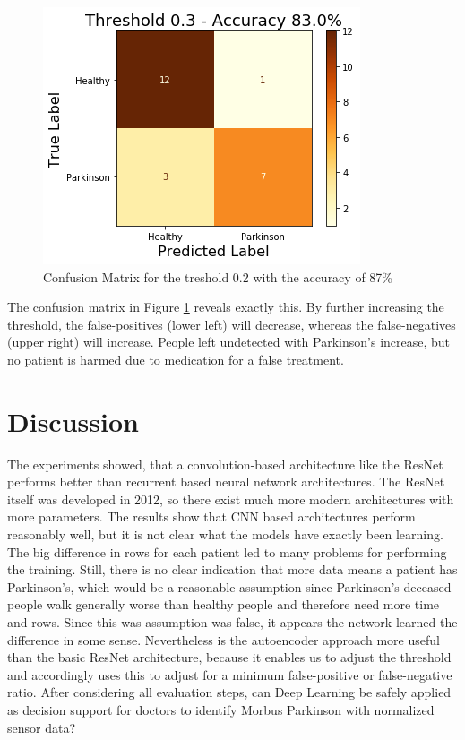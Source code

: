 \documentclass[journal]{IEEEtran}
\begin{document}
\begin{figure}
\centering
\includegraphics[width=1\linewidth]{../imgs/confusion_matrix}
\caption{Confusion Matrix for the treshold 0.2 with the accuracy of 87\%}
\label{fig:ac_cm}
\end{figure}

The confusion matrix in Figure \ref{fig:ac_cm} reveals exactly this. By further increasing the threshold, the false-positives (lower left) will decrease, whereas the false-negatives (upper right) will increase. People left undetected with Parkinson's increase, but no patient is harmed due to medication for a false treatment.
%
%
\section{Discussion}
The experiments showed, that a convolution-based architecture like the ResNet performs better than recurrent based neural network architectures. The ResNet itself was developed in 2012, so there exist much more modern architectures with more parameters. The results show that CNN based architectures perform reasonably well, but it is not clear what the models have exactly been learning. The big difference in rows for each patient led to many problems for performing the training. Still, there is no clear indication that more data means a patient has Parkinson's, which would be a reasonable assumption since Parkinson's deceased people walk generally worse than healthy people and therefore need more time and rows. Since this was assumption was false, it appears the network learned the difference in some sense. Nevertheless is the autoencoder approach more useful than the basic ResNet architecture, because it enables us to adjust the threshold and accordingly uses this to adjust for a minimum false-positive or false-negative ratio. 
After considering all evaluation steps, can Deep Learning be safely applied as decision support for doctors to identify Morbus Parkinson with normalized sensor data?
\end{document}
